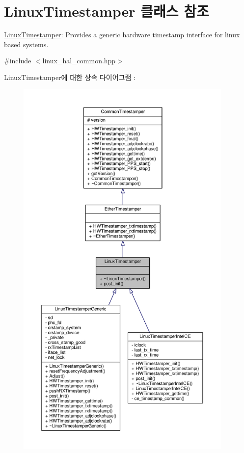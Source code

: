 \hypertarget{class_linux_timestamper}{}\section{Linux\+Timestamper 클래스 참조}
\label{class_linux_timestamper}


\hyperlink{class_linux_timestamper}{Linux\+Timestamper}\+: Provides a generic hardware timestamp interface for linux based systems.  




{\ttfamily \#include $<$linux\+\_\+hal\+\_\+common.\+hpp$>$}



Linux\+Timestamper에 대한 상속 다이어그램 \+: 
\nopagebreak
\begin{figure}[H]
\begin{center}
\leavevmode
\includegraphics[height=550pt]{class_linux_timestamper__inherit__graph}
\end{center}
\end{figure}


